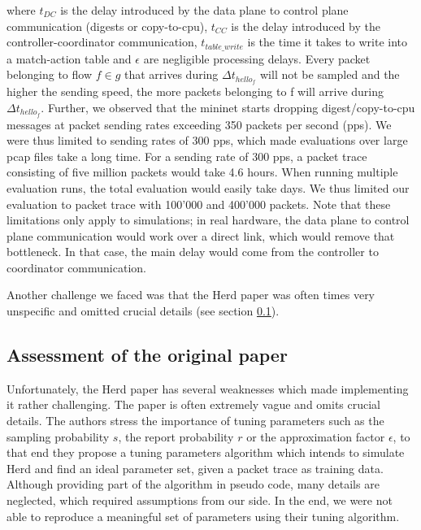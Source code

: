 \documentclass[11pt,oneside,a4paper]{article}
\begin{document}
\noindent where $t_{DC}$ is the delay introduced by the data plane to control plane communication (digests or copy-to-cpu), $t_{CC}$ is the delay introduced by the controller-coordinator communication, $t_{table\_write}$ is the time it takes to write into a match-action table and $\epsilon$ are negligible processing delays. Every packet belonging to flow $f \in g$ that arrives during $\Delta t_{hello_f}$ will not be sampled and the higher the sending speed, the more packets belonging to f will arrive during $\Delta t_{hello_f}$. Further, we observed that the mininet starts dropping digest/copy-to-cpu messages at packet sending rates exceeding 350 packets per second (pps). We were thus limited to sending rates of 300 pps, which made evaluations over large pcap files take a long time. For a sending rate of 300 pps, a packet trace consisting of five million packets would take 4.6 hours. When running multiple evaluation runs, the total evaluation would easily take days. We thus limited our evaluation to packet trace with 100'000 and 400'000 packets. Note that these limitations only apply to simulations; in real hardware, the data plane to control plane communication would work over a direct link, which would remove that bottleneck. In that case, the main delay would come from the controller to coordinator communication.

\noindent Another challenge we faced was that the Herd paper \cite{anon2019herd} was often times very unspecific and omitted crucial details (see section \ref{original_paper}). 


\subsection{Assessment of the original paper} \label{original_paper}

Unfortunately, the Herd paper \cite{anon2019herd} has several weaknesses which made implementing it rather challenging. The paper is often extremely vague and omits crucial details. The authors stress the importance of tuning parameters such as the sampling probability $s$, the report probability $r$ or the approximation factor $\epsilon$, to that end they propose a tuning parameters algorithm which intends to simulate Herd and find an ideal parameter set, given a packet trace as training data. Although providing part of the algorithm in pseudo code, many details are neglected, which required assumptions from our side. In the end, we were not able to reproduce a meaningful set of parameters using their tuning algorithm.
\end{document}
